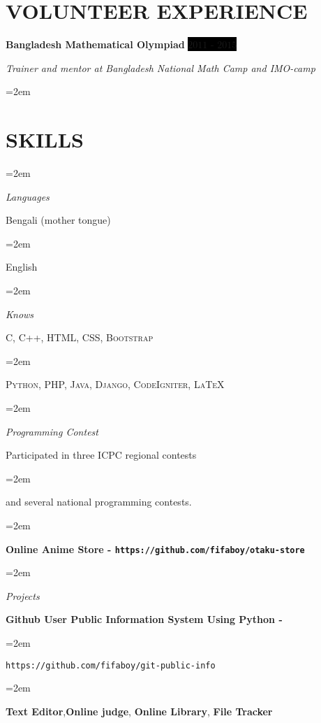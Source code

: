 \documentclass[paper=a4,fontsize=11pt]{scrartcl}
\newlength{\spacebox}
\newcommand{\sepspace}{\vspace*{1em}}		%
\newcommand{\NewPart}[1]{\section*{\uppercase{#1}}}
\newcommand{\PersonalEntry}[2]{
		\noindent\hangindent=2em\hangafter=0 %
		\parbox{\spacebox}{        %
		\textit{#1}}		       %
		\hspace{1.5em} #2 \par}    %
\newcommand{\SkillsEntry}[2]{      %
		\noindent\hangindent=2em\hangafter=0 %
		\parbox{\spacebox}{        %
		\textit{#1}}			   %
		\hspace{1.5em} #2 \par}    %
\newcommand{\EducationEntry}[4]{
		\noindent \textbf{#1} \hfill      %
		\colorbox{Black}{%
			\parbox{6em}{%
			\hfill\color{White}#2}} \par  %
		\noindent \textit{#3} \par        %
		\noindent\hangindent=2em\hangafter=0 \small #4 %
		\normalsize \par}
\newcommand{\WorkEntry}[4]{				  %
		\noindent \textbf{#1} \hfill      %
		\colorbox{Black}{\color{White}#2} \par  %
		\noindent \textit{#3} \par              %
		\noindent\hangindent=2em\hangafter=0 \small #4 %
		\normalsize \par}
\begin{document}
\NewPart{Volunteer Experience}
\WorkEntry{Bangladesh Mathematical Olympiad}{$2011$ - $2015$}{Trainer and mentor at Bangladesh National Math Camp and IMO-camp}

\sepspace


\NewPart{Skills}{}

\SkillsEntry{Languages}{Bengali (mother tongue)}
\SkillsEntry{}{English}

\SkillsEntry{Knows}{\textsc{C, C++, HTML, CSS, Bootstrap}}
\SkillsEntry{}{\textsc{Python, PHP, Java, Django, CodeIgniter, \LaTeX}}

\SkillsEntry{Programming Contest}{Participated in three ICPC regional contests }
\SkillsEntry{}{and several national programming contests.}

\SkillsEntry{}{\textbf{Online Anime Store - \texttt{https://github.com/fifaboy/otaku-store}}}
\SkillsEntry{Projects}{\textbf{Github User Public Information System Using Python -}}
\SkillsEntry{}{\texttt{https://github.com/fifaboy/git-public-info}}
\SkillsEntry{}{ \textbf{Text Editor},\textbf{Online judge}, \textbf{Online Library}, \textbf{File Tracker}}


\end{document}
